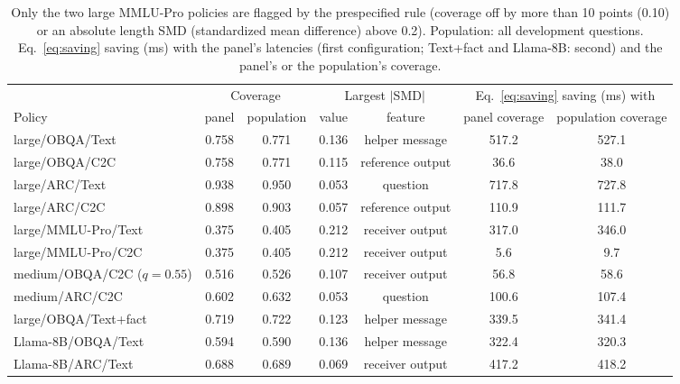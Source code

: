 \begin{table}[!htbp]\centering\scriptsize
\caption{Only the two large MMLU-Pro policies are flagged by the prespecified rule (coverage off by more than 10 points (0.10) or an absolute length SMD (standardized mean difference) above 0.2). Population: all development questions. Eq.~\eqref{eq:saving} saving (ms) with the panel's latencies (first configuration; Text+fact and Llama-8B: second) and the panel's or the population's coverage.}
\label{tab:panelrep}
\renewcommand{\arraystretch}{1.1}\setlength{\tabcolsep}{3pt}
\begin{tabular*}{\linewidth}{@{}l@{\hspace{5pt}\extracolsep{\fill}}cccccc@{}}\toprule
& \multicolumn{2}{c}{Coverage} & \multicolumn{2}{c}{Largest $|$SMD$|$} & \multicolumn{2}{c}{Eq.~\eqref{eq:saving} saving (ms) with}\\\cmidrule(lr){2-3}\cmidrule(lr){4-5}\cmidrule(l){6-7}
Policy & panel & population & value & feature & panel coverage & population coverage\\\midrule
large/OBQA/Text & 0.758 & 0.771 & 0.136 & helper message & 517.2 & 527.1\\
large/OBQA/C2C & 0.758 & 0.771 & 0.115 & reference output & 36.6 & 38.0\\
large/ARC/Text & 0.938 & 0.950 & 0.053 & question & 717.8 & 727.8\\
large/ARC/C2C & 0.898 & 0.903 & 0.057 & reference output & 110.9 & 111.7\\
large/MMLU-Pro/Text & 0.375 & 0.405 & 0.212 & receiver output & 317.0 & 346.0\\
large/MMLU-Pro/C2C & 0.375 & 0.405 & 0.212 & receiver output & 5.6 & 9.7\\
medium/OBQA/C2C ($q=0.55$) & 0.516 & 0.526 & 0.107 & receiver output & 56.8 & 58.6\\
medium/ARC/C2C & 0.602 & 0.632 & 0.053 & question & 100.6 & 107.4\\
large/OBQA/Text+fact & 0.719 & 0.722 & 0.123 & helper message & 339.5 & 341.4\\
Llama-8B/OBQA/Text & 0.594 & 0.590 & 0.136 & helper message & 322.4 & 320.3\\
Llama-8B/ARC/Text & 0.688 & 0.689 & 0.069 & receiver output & 417.2 & 418.2\\\bottomrule
\end{tabular*}
\end{table}

